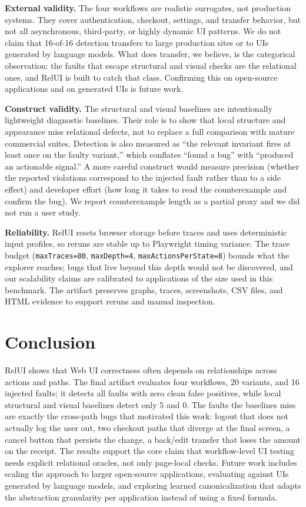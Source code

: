 \documentclass[sigconf,nonacm]{acmart}
\newcommand{\RelUI}{RelUI\xspace}
\begin{document}
\textbf{External validity.} The four workflows are realistic surrogates, not production systems. They cover authentication, checkout, settings, and transfer behavior, but not all asynchronous, third-party, or highly dynamic UI patterns. We do not claim that 16-of-16 detection transfers to large production sites or to UIs generated by language models. What does transfer, we believe, is the categorical observation: the faults that escape structural and visual checks are the relational ones, and \RelUI is built to catch that class. Confirming this on open-source applications and on generated UIs is future work.

\textbf{Construct validity.} The structural and visual baselines are intentionally lightweight diagnostic baselines. Their role is to show that local structure and appearance miss relational defects, not to replace a full comparison with mature commercial suites. Detection is also measured as ``the relevant invariant fires at least once on the faulty variant,'' which conflates ``found a bug'' with ``produced an actionable signal.'' A more careful construct would measure precision (whether the reported violations correspond to the injected fault rather than to a side effect) and developer effort (how long it takes to read the counterexample and confirm the bug). We report counterexample length as a partial proxy and we did not run a user study.

\textbf{Reliability.} \RelUI resets browser storage before traces and uses deterministic input profiles, so reruns are stable up to Playwright timing variance. The trace budget (\texttt{maxTraces=80}, \texttt{maxDepth=4}, \texttt{maxActionsPerState=8}) bounds what the explorer reaches; bugs that live beyond this depth would not be discovered, and our scalability claims are calibrated to applications of the size used in this benchmark. The artifact preserves graphs, traces, screenshots, CSV files, and HTML evidence to support reruns and manual inspection.

\section{Conclusion}\label{sec:conclusion}
\RelUI shows that Web UI correctness often depends on relationships across actions and paths. The final artifact evaluates four workflows, 20 variants, and 16 injected faults; it detects all faults with zero clean false positives, while local structural and visual baselines detect only 5 and 0. The faults the baselines miss are exactly the cross-path bugs that motivated this work: logout that does not actually log the user out, two checkout paths that diverge at the final screen, a cancel button that persists the change, a back/edit transfer that loses the amount on the receipt. The results support the core claim that workflow-level UI testing needs explicit relational oracles, not only page-local checks. Future work includes scaling the approach to larger open-source applications, evaluating against UIs generated by language models, and exploring learned canonicalization that adapts the abstraction granularity per application instead of using a fixed formula.


\end{document}
